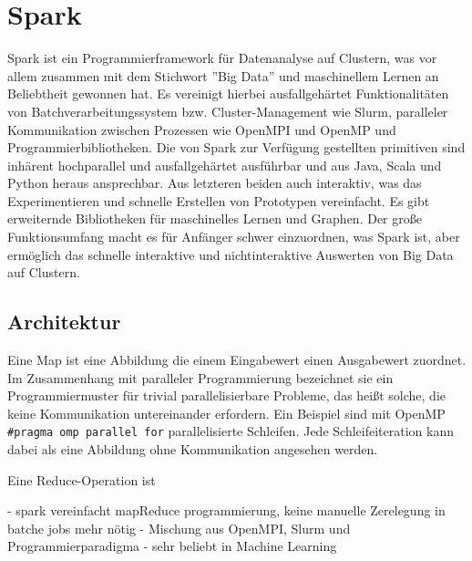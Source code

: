 \chapter{Spark}
\label{sct:spark}

Spark ist ein Programmierframework für Datenanalyse auf Clustern, was vor allem zusammen mit dem Stichwort ''Big Data'' und maschinellem Lernen an Beliebtheit gewonnen hat. Es vereinigt hierbei ausfallgehärtet Funktionalitäten von Batchverarbeitungssystem bzw. Cluster-Management wie Slurm, paralleler Kommunikation zwischen Prozessen wie OpenMPI und OpenMP und Programmierbibliotheken. Die von Spark zur Verfügung gestellten primitiven sind inhärent hochparallel und ausfallgehärtet ausführbar und aus Java, Scala und Python heraus ansprechbar. Aus letzteren beiden auch interaktiv, was das Experimentieren und schnelle Erstellen von Prototypen vereinfacht. Es gibt erweiternde Bibliotheken für maschinelles Lernen und Graphen. Der große Funktionsumfang macht es für Anfänger schwer einzuordnen, was Spark ist, aber ermöglich das schnelle interaktive und nichtinteraktive Auswerten von Big Data auf Clustern.



\section{Architektur}

Eine Map ist eine Abbildung die einem Eingabewert einen Ausgabewert zuordnet. Im Zusammenhang mit paralleler Programmierung bezeichnet sie ein Programmiermuster für trivial parallelisierbare Probleme, das heißt solche, die keine Kommunikation untereinander erfordern. Ein Beispiel sind mit OpenMP  \lstinline!#pragma omp parallel for! parallelisierte Schleifen. Jede Schleifeiteration kann dabei als eine Abbildung ohne Kommunikation angesehen werden.

Eine Reduce-Operation ist

 - spark vereinfacht mapReduce programmierung, keine manuelle Zerelegung in batche jobs mehr nötig
 - Mischung aus OpenMPI, Slurm und Programmierparadigma
 - sehr beliebt in Machine Learning

